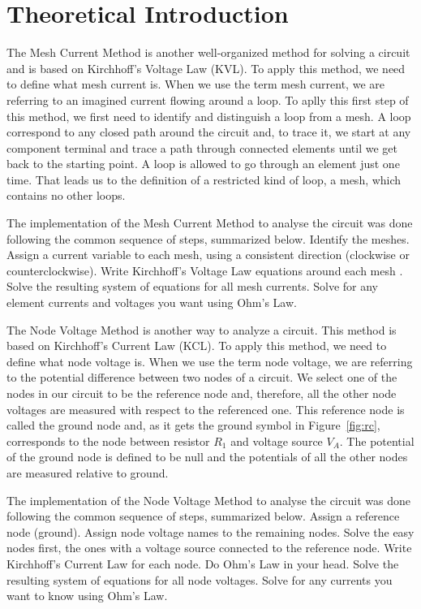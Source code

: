 \section{Theoretical Introduction}
\label{sec:theoretical}

The Mesh Current Method is another well-organized method for solving a circuit and is based on Kirchhoff's Voltage Law (KVL). To apply this method, we need to define what mesh current is. When we use the term mesh current, we are referring to an imagined current flowing around a loop. To aplly this first step of this method, we first need to identify and distinguish a loop from a mesh. A loop correspond to any closed path around the circuit and, to trace it, we start at any component terminal and trace a path through connected elements until we get back to the starting point. A loop is allowed to go through an element just one time. That leads us to the definition of a restricted kind of loop, a mesh, which contains no other loops.

The implementation of the Mesh Current Method to analyse the circuit was done following the common sequence of steps, summarized below.
    Identify the meshes.
    Assign a current variable to each mesh, using a consistent direction (clockwise or counterclockwise).
    Write Kirchhoff's Voltage Law equations around each mesh .
    Solve the resulting system of equations for all mesh currents.
    Solve for any element currents and voltages you want using Ohm's Law.

The Node Voltage Method is another way to analyze a circuit. This method is based on Kirchhoff's Current Law (KCL). To apply this method, we need to define what node voltage is. When we use the term node voltage, we are referring to the potential difference between two nodes of a circuit. We select one of the nodes in our circuit to be the reference node and, therefore, all the other node voltages are measured with respect to the referenced one. This reference node is called the ground node and, as it gets the ground symbol in Figure~\ref{fig:rc}, corresponds to the node between resistor $R_1$ and voltage source $V_A$. The potential of the ground node is defined to be null and the potentials of all the other nodes are measured relative to ground.

The implementation of the Node Voltage Method to analyse the circuit was done following the common sequence of steps, summarized below.
    Assign a reference node (ground).
    Assign node voltage names to the remaining nodes.
    Solve the easy nodes first, the ones with a voltage source connected to the reference node.
    Write Kirchhoff's Current Law for each node. Do Ohm's Law in your head.
    Solve the resulting system of equations for all node voltages.
    Solve for any currents you want to know using Ohm's Law.

